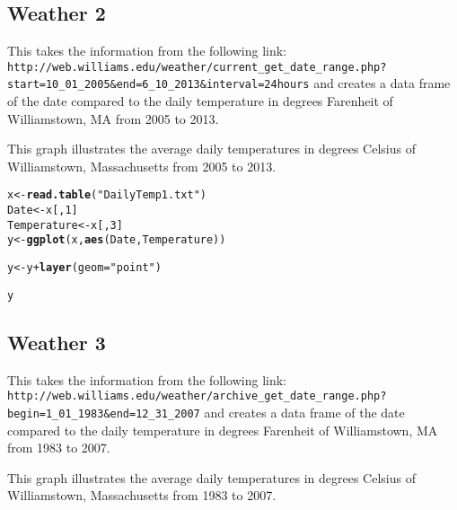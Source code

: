 \documentclass{article}\usepackage{graphicx, color}
\makeatletter
\newcommand{\hlfunctioncall}[1]{\textcolor[rgb]{0.501960784313725,0,0.329411764705882}{\textbf{#1}}}%
\newcommand{\hlstring}[1]{\textcolor[rgb]{0.6,0.6,1}{#1}}%
\newenvironment{kframe}{%
 \def\at@end@of@kframe{}%
 \ifinner\ifhmode%
  \def\at@end@of@kframe{\end{minipage}}%
  \begin{minipage}{\columnwidth}%
 \fi\fi%
 \def\FrameCommand##1{\hskip\@totalleftmargin \hskip-\fboxsep
 \colorbox{shadecolor}{##1}\hskip-\fboxsep
     \hskip-\linewidth \hskip-\@totalleftmargin \hskip\columnwidth}%
 \MakeFramed {\advance\hsize-\width
   \@totalleftmargin\z@ \linewidth\hsize
   \@setminipage}}%
 {\par\unskip\endMakeFramed%
 \at@end@of@kframe}
\newenvironment{knitrout}{}{} %
\makeatother
\begin{document}
\subsection*{Weather 2}
This takes the information from the following link:
\verb+http://web.williams.edu/weather/current_get_date_range.php?start=10_01_2005&end=6_10_2013&interval=24hours+
and creates a data frame of the date compared to the daily temperature
in degrees Farenheit of Williamstown, MA from 2005 to 2013.

This graph illustrates the average daily temperatures in degrees Celsius of
Williamstown, Massachusetts from 2005 to 2013.

\begin{knitrout}
\color{fgcolor}\begin{kframe}
\begin{alltt}
x <- \hlfunctioncall{read.table}(\hlstring{"DailyTemp1.txt"})
Date <- x[, 1]
Temperature <- x[, 3]
y <- \hlfunctioncall{ggplot}(x, \hlfunctioncall{aes}(Date, Temperature))
\end{alltt}


{\ttfamily\noindent\bfseries\color{errorcolor}{\#\# Error: could not find function "ggplot"}}\begin{alltt}
y <- y + \hlfunctioncall{layer}(geom = \hlstring{"point"})
\end{alltt}


{\ttfamily\noindent\bfseries\color{errorcolor}{\#\# Error: object 'y' not found}}\begin{alltt}
y
\end{alltt}


{\ttfamily\noindent\bfseries\color{errorcolor}{\#\# Error: object 'y' not found}}\end{kframe}
\end{knitrout}


\subsection*{Weather 3}
This takes the information from the following link:
 \verb+http://web.williams.edu/weather/archive_get_date_range.php?begin=1_01_1983&end=12_31_2007+
and creates a data frame of the date compared to the daily temperature
in degrees Farenheit of Williamstown, MA from 1983 to 2007.

This graph illustrates the average daily temperatures in degrees Celsius of
Williamstown, Massachusetts from 1983 to 2007.
\end{document}
